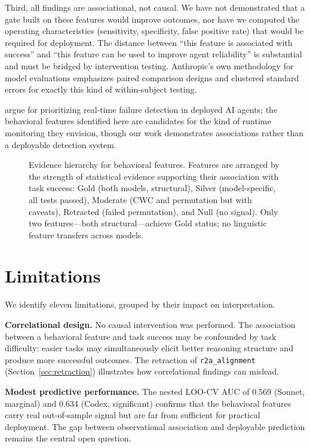 \documentclass[11pt]{article}
\newcommand{\feat}[1]{\texttt{#1}}
\newcommand{\rtalign}{\feat{r2a\_alignment}}
\begin{document}
Third, all findings are associational, not causal.
We have not demonstrated that a gate built on these features would improve outcomes, nor have we computed the operating characteristics (sensitivity, specificity, false positive rate) that would be required for deployment.
The distance between ``this feature is associated with success'' and ``this feature can be used to improve agent reliability'' is substantial and must be bridged by intervention testing.
Anthropic's own methodology for model evaluations \citep{anthropic2025evaluations} emphasizes paired comparison designs and clustered standard errors for exactly this kind of within-subject testing.

\citet{srikumar2025prioritizing} argue for prioritizing real-time failure detection in deployed AI agents; the behavioral features identified here are candidates for the kind of runtime monitoring they envision, though our work demonstrates associations rather than a deployable detection system.

\begin{figure}[t]
\centering
\resizebox{\textwidth}{!}{}
\caption{Evidence hierarchy for behavioral features. Features are arranged by the strength of statistical evidence supporting their association with task success: Gold (both models, structural), Silver (model-specific, all tests passed), Moderate (CWC and permutation but with caveats), Retracted (failed permutation), and Null (no signal). Only two features---both structural---achieve Gold status; no linguistic feature transfers across models.}
\label{fig:hierarchy}
\end{figure}


\section{Limitations}
\label{sec:limitations}

We identify eleven limitations, grouped by their impact on interpretation.

\textbf{Correlational design.}
No causal intervention was performed.
The association between a behavioral feature and task success may be confounded by task difficulty: easier tasks may simultaneously elicit better reasoning structure and produce more successful outcomes.
The retraction of \rtalign{} (Section~\ref{sec:retraction}) illustrates how correlational findings can mislead.

\textbf{Modest predictive performance.}
The nested LOO-CV AUC of 0.569 (Sonnet, marginal) and 0.634 (Codex, significant) confirms that the behavioral features carry real out-of-sample signal but are far from sufficient for practical deployment.
The gap between observational association and deployable prediction remains the central open question.
\end{document}
